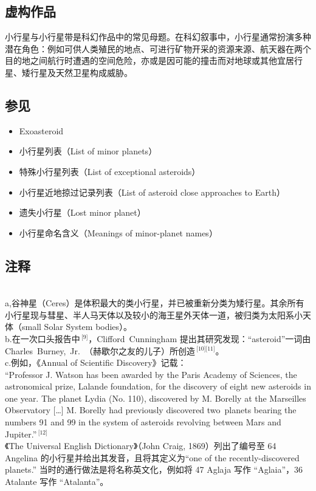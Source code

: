 \subsection{虚构作品}  
小行星与小行星带是科幻作品中的常见母题。在科幻叙事中，小行星通常扮演多种潜在角色：例如可供人类殖民的地点、可进行矿物开采的资源来源、航天器在两个目的地之间航行时遭遇的空间危险，亦或是因可能的撞击而对地球或其他宜居行星、矮行星及天然卫星构成威胁。
\subsection{参见}  
\begin{itemize}
\item Exoasteroid  
\item 小行星列表（List of minor planets）  
\item 特殊小行星列表（List of exceptional asteroids）  
\item 小行星近地掠过记录列表（List of asteroid close approaches to Earth）  
\item 遗失小行星（Lost minor planet）  
\item 小行星命名含义（Meanings of minor-planet names）
\end{itemize}
\subsection{注释}\\
a,谷神星（Ceres）是体积最大的类小行星，并已被重新分类为矮行星。其余所有小行星现与彗星、半人马天体以及较小的海王星外天体一道，被归类为太阳系小天体（small Solar System bodies）。\\
b.在一次口头报告中\,\(^\text{[9]}\)，Clifford~Cunningham 提出其研究发现：“asteroid”一词由 Charles~Burney,~Jr.\ （赫歇尔之友的儿子）所创造\,\(^\text{[10][11]}\)。\\
c.例如，《Annual of Scientific Discovery》记载：\\
``Professor J. Watson has been awarded by the Paris Academy of Sciences, the astronomical prize, Lalande foundation, for the discovery of eight new asteroids in one year. The planet Lydia (No. 110), discovered by M. Borelly at the Marseilles Observatory [\dots] M. Borelly had previously discovered two~planets bearing the numbers 91 and 99 in the system of asteroids revolving between Mars and Jupiter.''\,\(^\text{[12]}\)\\
《The Universal English Dictionary》（John Craig, 1869）列出了编号至 64 Angelina 的小行星并给出其发音，且将其定义为“one of the recently-discovered planets.” 当时的通行做法是将名称英文化，例如将 47 Aglaja 写作 “Aglaia”，36 Atalante 写作 “Atalanta”。

